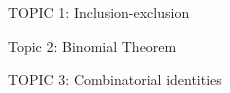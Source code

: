 \documentclass[handout]{mcs}
\begin{document}
\renewcommand{\reading}{
}



\begin{staffnotes}
TOPIC 1: Inclusion-exclusion
\end{staffnotes}

\begin{staffnotes}
Topic 2: Binomial Theorem
\end{staffnotes}

\begin{staffnotes}
TOPIC 3: Combinatorial identities
\end{staffnotes}

\end{document}
